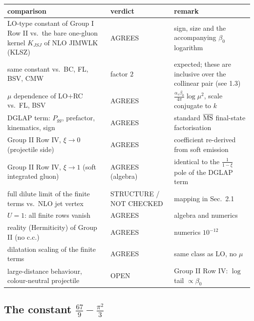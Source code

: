 \begin{center}
\renewcommand{\arraystretch}{1.25}
\begin{tabular}{|p{}|p{}|p{}|}
\hline
comparison & verdict & remark\\\hline
LO-type constant of Group I Row II vs.\ the bare one-gluon kernel $K_{JSJ}$ of NLO JIMWLK (KLSZ) & AGREES & sign, size and the accompanying $\beta_{0}$ logarithm\\
same constant vs.\ BC, FL, BSV, CMW & factor $2$ & expected; these are inclusive over the collinear pair (see 1.3)\\
$\mu$ dependence of LO$+$RC vs.\ FL, BSV & AGREES & $\frac{\alpha_{s}\beta_{0}}{4\pi}\log\mu^{2}$, scale conjugate to $k$\\
DGLAP term: $P_{gg}$, prefactor, kinematics, sign & AGREES & standard $\overline{\rm MS}$ final-state factorisation\\
Group II Row IV, $\xi\to0$ (projectile side) & AGREES & coefficient re-derived from soft emission\\
Group II Row IV, $\xi\to1$ (soft integrated gluon) & AGREES (algebra) & identical to the $\frac{1}{1-\xi}$ pole of the DGLAP term\\
full dilute limit of the finite terms vs.\ NLO jet vertex & STRUCTURE / NOT CHECKED & mapping in Sec.~2.1\\
$U=1$: all finite rows vanish & AGREES & algebra and numerics\\
reality (Hermiticity) of Group II (no c.c.) & AGREES & numerics $10^{-12}$\\
dilatation scaling of the finite terms & AGREES & same class as LO, no $\mu$\\
large-distance behaviour, colour-neutral projectile & OPEN & Group II Row IV: $\log$ tail $\propto\beta_{0}$\\\hline
\end{tabular}
\end{center}

\subsection{The constant $\frac{67}{9}-\frac{\pi^{2}}{3}$}
